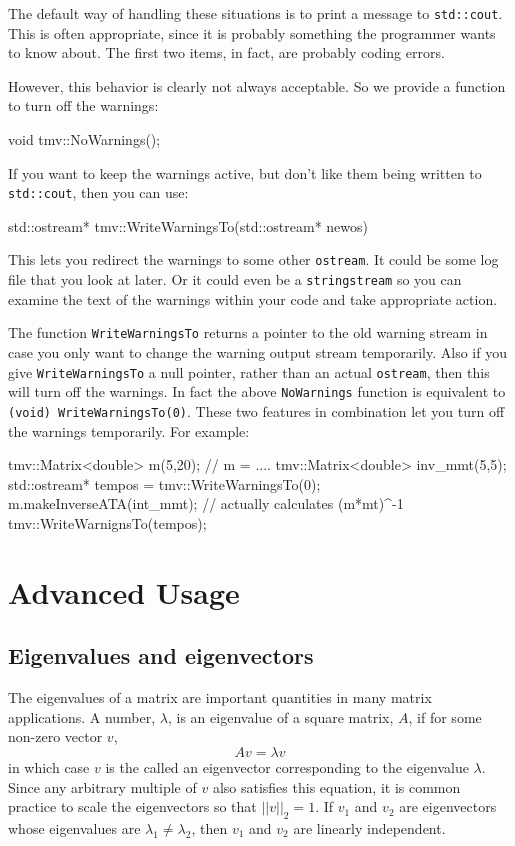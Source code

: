 \documentclass[twoside,letterpaper,11pt]{article}
\renewcommand{\tt}[1]{{\lstinline {#1}}}
\begin{document}
The default way of handling these situations is to print a message to \tt{std::cout}.  This is often
appropriate, since it is probably something the programmer wants to know about.
The first two items, in fact, are probably coding errors.

However, this behavior is clearly not always acceptable.  So we provide a function to 
turn off the warnings:
\begin{tmvcode}
void tmv::NoWarnings();
\end{tmvcode}

If you want to keep the warnings active, but don't like them being written to \tt{std::cout}, then 
you can use:
\begin{tmvcode}
std::ostream* tmv::WriteWarningsTo(std::ostream* newos)
\end{tmvcode}
This lets you redirect the warnings to some other \tt{ostream}.  It could be some log file
that you look at later.  Or it could even be a \tt{stringstream} so you can examine the text
of the warnings within your code and take appropriate action.

The function \tt{WriteWarningsTo} returns a pointer to the old warning stream
in case you only want to change the warning output stream temporarily.
Also if you give \tt{WriteWarningsTo} a null pointer, rather than an actual \tt{ostream},
then this will turn off the warnings.  In fact the above \tt{NoWarnings} function is 
equivalent to \tt{(void) WriteWarningsTo(0)}.  These two features in combination
let you turn off the warnings temporarily.  For example:
\begin{tmvcode}
tmv::Matrix<double> m(5,20);
// m = ....
tmv::Matrix<double> inv_mmt(5,5);
std::ostream* tempos = tmv::WriteWarningsTo(0);
m.makeInverseATA(int_mmt); // actually calculates (m*mt)^-1
tmv::WriteWarnignsTo(tempos);
\end{tmvcode}

\newpage
\section{Advanced Usage}

\subsection{Eigenvalues and eigenvectors}
\label{Eigenvalues}

The eigenvalues of a matrix are important quantities in many matrix applications.
A number, $\lambda$, is an eigenvalue of a square matrix, $A$, if for some
non-zero vector $v$,
\begin{equation*}
A v = \lambda v
\end{equation*}
in which case $v$ is the called an eigenvector corresponding to the eigenvalue $\lambda$.
Since any arbitrary multiple of $v$ also satisfies this equation, it is common practice
to scale the eigenvectors so that $||v||_2 = 1$.
If $v_1$ and $v_2$ are eigenvectors whose eigenvalues are 
$\lambda_1 \neq \lambda_2$, then $v_1$ and $v_2$ are linearly independent.
\end{document}
